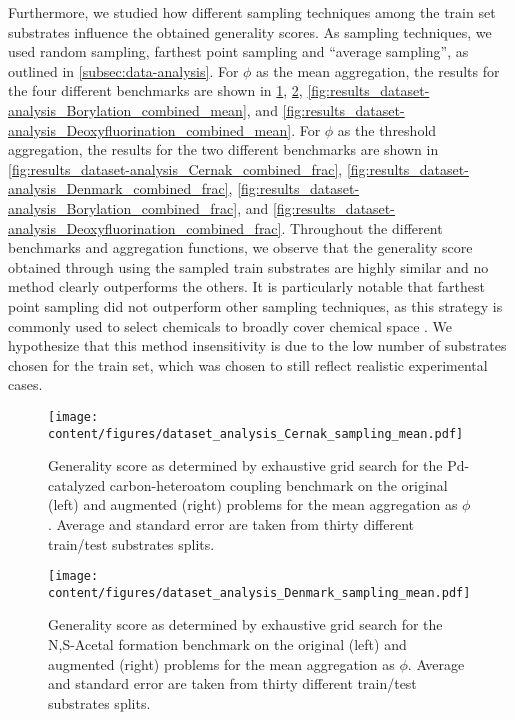 Furthermore, we studied how different sampling techniques among the train set substrates influence the obtained generality scores.
As sampling techniques, we used random sampling, farthest point sampling and ``average sampling'', as outlined in \cref{subsec:data-analysis}.
For $\phi$ as the mean aggregation, the results for the four different benchmarks are shown in \cref{fig:results_dataset-analysis_Cernak_combined_mean}, \cref{fig:results_dataset-analysis_Denmark_combined_mean}, \cref{fig:results_dataset-analysis_Borylation_combined_mean}, and \cref{fig:results_dataset-analysis_Deoxyfluorination_combined_mean}.
For $\phi$ as the threshold aggregation, the results for the two different benchmarks are shown in \cref{fig:results_dataset-analysis_Cernak_combined_frac}, \cref{fig:results_dataset-analysis_Denmark_combined_frac}, \cref{fig:results_dataset-analysis_Borylation_combined_frac}, and \cref{fig:results_dataset-analysis_Deoxyfluorination_combined_frac}.
Throughout the different benchmarks and aggregation functions, we observe that the generality score obtained through using the sampled train substrates are highly similar and no method clearly outperforms the others.
It is particularly notable that farthest point sampling did not outperform other sampling techniques, as this strategy is commonly used to select chemicals to broadly cover chemical space \citep{henle_development_2020, gensch_comprehensive_2022, gensch_design_2022, schnitzer_machine_2024}.
We hypothesize that this method insensitivity is due to the low number of substrates chosen for the train set, which was chosen to still reflect realistic experimental cases.

\begin{figure}[t]
    \centering
    \texttt{[image: content/figures/dataset\_analysis\_Cernak\_sampling\_mean.pdf]}
    \caption{Generality score as determined by exhaustive grid search for the Pd-catalyzed carbon-heteroatom coupling benchmark on the original (left) and augmented (right) problems for the mean aggregation as $\phi$. Average and standard error are taken from thirty different train/test substrates splits.}
    \label{fig:results_dataset-analysis_Cernak_combined_mean}
\end{figure}

\begin{figure}[t]
    \centering
    \texttt{[image: content/figures/dataset\_analysis\_Denmark\_sampling\_mean.pdf]}
    \caption{Generality score as determined by exhaustive grid search for the N,S-Acetal formation benchmark on the original (left) and augmented (right) problems for the mean aggregation as $\phi$. Average and standard error are taken from thirty different train/test substrates splits.}
    \label{fig:results_dataset-analysis_Denmark_combined_mean}
\end{figure}

